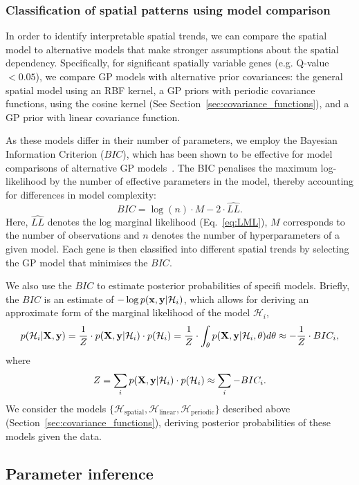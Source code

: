 \subsubsection*{Classification of spatial patterns using model comparison}

In order to identify interpretable spatial trends, we can compare the spatial model to alternative models that make stronger assumptions about the spatial dependency. 
Specifically, for significant spatially variable genes (e.g. Q-value \( < 0.05 \)), we compare GP models with alternative prior covariances: the general spatial model using an RBF kernel, a GP priors with periodic covariance functions, using the cosine kernel (See Section~\ref{sec:covariance_functions}), and a GP prior with linear covariance function.

As these models differ in their number of parameters, we employ the Bayesian Information Criterion (\( BIC \)), which has been shown to be effective for model comparisons of alternative GP models~\cite{Lloyd2014-ky}. The BIC penalises the maximum log-likelihood by the number of effective parameters in the model, thereby accounting for differences in model complexity:
\[
BIC = \log (n) \cdot M - 2 \cdot \hat{LL}.
\]
Here, \( \hat{LL} \) denotes the log marginal likelihood (Eq.~\ref{eq:LML}), $ M $ corresponds to the number of observations and $n$ denotes the number of hyperparameters of a given model. Each gene is then classified into different spatial trends by selecting the GP model that minimises the \( BIC \).

We also use the \( BIC \) to estimate posterior probabilities of specifi models. Briefly, the \( BIC \) is an estimate of \( -\log p( {\bf x}, {\bf y} | \mathcal{H}_i ) \), which allows for deriving an approximate form of the marginal likelihood of the model \( \mathcal{H}_i \),
\[
p( \mathcal{H}_i | {\bf X}, {\bf y}) = \frac{1}{Z} \cdot p({\bf X}, {\bf y} | \mathcal{H}_i) \cdot p( \mathcal{H}_i ) = \frac{1}{Z} \cdot \int_{\theta} p( {\bf X}, {\bf y} | \mathcal{H}_i, \theta ) d \theta \approx -\frac{1}{Z} \cdot BIC_i, 
\]
where
\[
Z = \sum_i p({\bf X}, {\bf y} | \mathcal{H}_i) \cdot p( \mathcal{H}_i ) \approx \sum_i -BIC_i.
\]
We consider the models \( \{ \mathcal{H}_{\text{spatial}}, \mathcal{H}_{\text{linear}}, \mathcal{H}_{\text{periodic}} \} \) described above (Section~\ref{sec:covariance_functions}), deriving posterior probabilities of these models given the data.


\subsection{Parameter inference}
\label{sec:param_inference}

